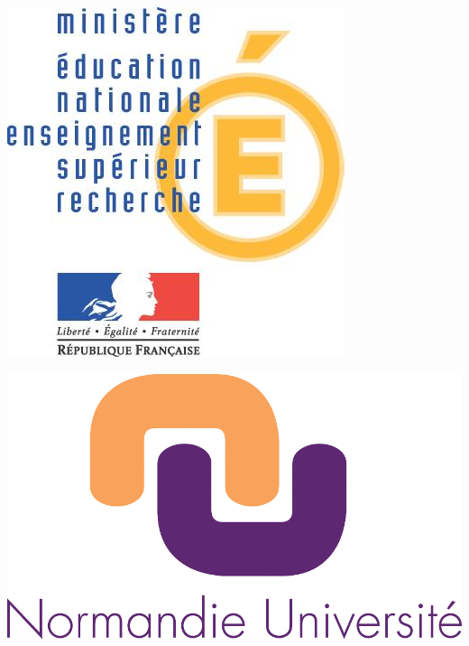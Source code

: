 \documentclass[a4paper]{book}
\begin{document}
\begin{minipage}[c]{0.8in}
  \includegraphics[width=1\linewidth]{logos/MENESR.png}
\end{minipage}\hfill
\begin{minipage}[c]{1.12in}
  \includegraphics[width=1\linewidth]{logos/NormandieUniversite.png}
\end{minipage}\hfill
\end{document}
